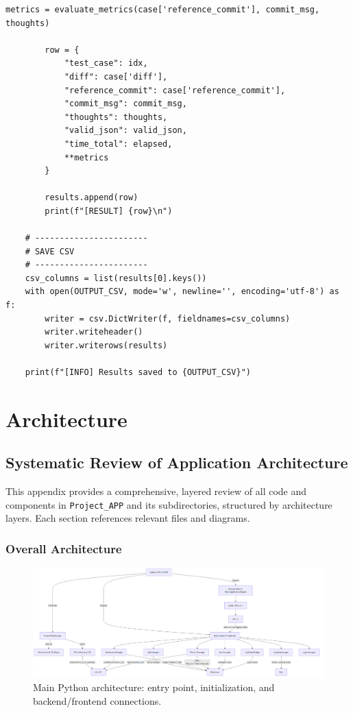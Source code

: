 \documentclass{report}
\begin{document}
\begin{lstlisting}[style=pythonstyle]
        metrics = evaluate_metrics(case['reference_commit'], commit_msg, thoughts)

        row = {
            "test_case": idx,
            "diff": case['diff'],
            "reference_commit": case['reference_commit'],
            "commit_msg": commit_msg,
            "thoughts": thoughts,
            "valid_json": valid_json,
            "time_total": elapsed,
            **metrics
        }

        results.append(row)
        print(f"[RESULT] {row}\n")

    # -----------------------
    # SAVE CSV
    # -----------------------
    csv_columns = list(results[0].keys())
    with open(OUTPUT_CSV, mode='w', newline='', encoding='utf-8') as f:
        writer = csv.DictWriter(f, fieldnames=csv_columns)
        writer.writeheader()
        writer.writerows(results)

    print(f"[INFO] Results saved to {OUTPUT_CSV}")

\end{lstlisting}
\chapter{Architecture}\label{Architecture}
\section*{Systematic Review of Application Architecture}

This appendix provides a comprehensive, layered review of all code and components in \texttt{Project\_APP} and its subdirectories, structured by architecture layers. Each section references relevant files and diagrams.

\subsection*{Overall Architecture}
\begin{figure}
\centering
\includegraphics[width=\linewidth,height=\textheight,keepaspectratio]{png_files/main_py_architecture.png}
\caption{Main Python architecture: entry point, initialization, and backend/frontend connections.}
\end{figure}
\end{document}
